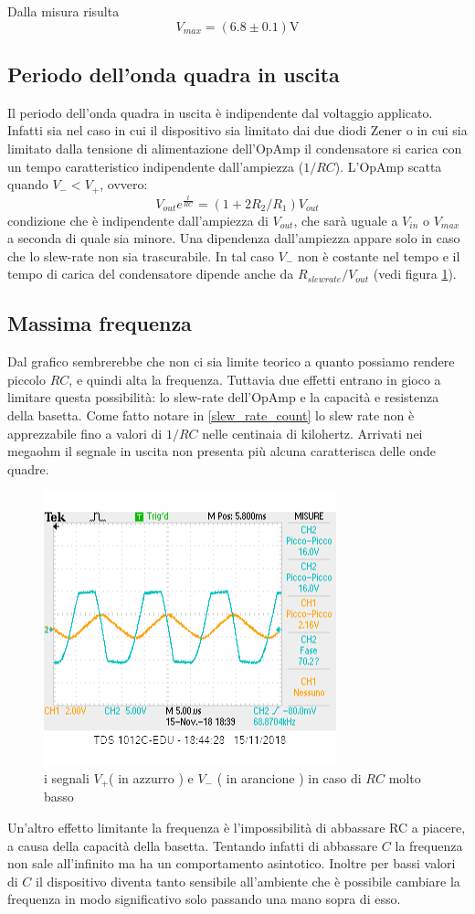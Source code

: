 \documentclass[10pt,a4paper]{article}
\begin{document}
Dalla misura risulta \[V_{max} = ( 6.8\pm 0.1) \si \volt\]

\subsection{Periodo dell'onda quadra in uscita}
Il periodo dell'onda quadra in uscita è indipendente dal voltaggio applicato. Infatti sia nel caso in cui il dispositivo sia limitato dai due diodi Zener o in cui sia limitato dalla tensione di alimentazione dell'OpAmp il condensatore si carica con un tempo caratteristico indipendente dall'ampiezza ($1/RC$). L'OpAmp scatta quando $V_- < V_+$, ovvero:
\[V_{out} e^{\frac{t}{RC}} = (1+ 2 R_2/R_1) V_{out}\]
condizione che è indipendente dall'ampiezza di $V_{out}$, che sarà uguale a $V_{in}$ o $V_{max}$ a seconda di quale sia minore.
Una dipendenza dall'ampiezza appare solo in caso che lo slew-rate non sia trascurabile. In tal caso $V_-$ non è costante nel tempo e il tempo di carica del condensatore dipende anche da $R_{slew rate} / V_{out}$ (vedi figura \ref{fig:slew_rate}). 

\subsection{Massima frequenza}
Dal grafico sembrerebbe che non ci sia limite teorico a quanto possiamo rendere piccolo $RC$, e quindi alta la frequenza. Tuttavia due effetti entrano in gioco a limitare questa possibilità: lo slew-rate dell'OpAmp e la capacità e resistenza della basetta. Come fatto notare in \ref{slew_rate_count} lo slew rate non è apprezzabile fino a valori di $1/RC$ nelle centinaia di kilohertz. Arrivati nei megaohm il segnale in uscita non presenta più alcuna caratterisca delle onde quadre.

 \begin{figure}[h]
	\centering
	\includegraphics[scale=0.8]{freqRbassa.png}
	\caption{\small i segnali $V_+$( in azzurro ) e $V_-$ ( in arancione )  in caso di $RC$ molto basso}
	\label{fig:slew_rate}
\end{figure}

Un'altro effetto limitante la frequenza è l'impossibilità di abbassare RC a piacere, a causa della capacità della basetta. Tentando infatti di abbassare $C$ la frequenza non sale all'infinito ma ha un comportamento asintotico. Inoltre per bassi valori di $C$ il dispositivo diventa tanto sensibile all'ambiente che è possibile cambiare la frequenza in modo significativo solo passando una mano sopra di esso.
\end{document}
